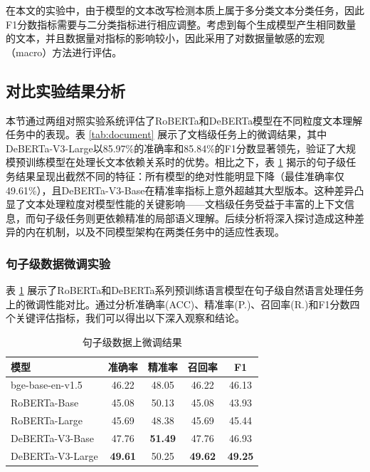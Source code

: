 在本文的实验中，由于模型的文本改写检测本质上属于多分类文本分类任务，因此F1分数指标需要与二分类指标进行相应调整。考虑到每个生成模型产生相同数量的文本，并且数据量对指标的影响较小，因此采用了对数据量敏感的宏观（macro）方法进行评估。

\subsection{对比实验结果分析}
\label{sec:method-experiment-main}

本节通过两组对照实验系统评估了RoBERTa和DeBERTa模型在不同粒度文本理解任务中的表现。表 \ref{tab:document} 展示了文档级任务上的微调结果，其中DeBERTa-V3-Large以85.97\%的准确率和85.84\%的F1分数显著领先，验证了大规模预训练模型在处理长文本依赖关系时的优势。相比之下，表 \ref{tab:sentence} 揭示的句子级任务结果呈现出截然不同的特征：所有模型的绝对性能明显下降（最佳准确率仅49.61\%），且DeBERTa-V3-Base在精准率指标上意外超越其大型版本。这种差异凸显了文本处理粒度对模型性能的关键影响——文档级任务受益于丰富的上下文信息，而句子级任务则更依赖精准的局部语义理解。后续分析将深入探讨造成这种差异的内在机制，以及不同模型架构在两类任务中的适应性表现。

\subsubsection{句子级数据微调实验}

表 \ref{tab:sentence} 展示了RoBERTa和DeBERTa系列预训练语言模型在句子级自然语言处理任务上的微调性能对比。通过分析准确率(ACC)、精准率(P.)、召回率(R.)和F1分数四个关键评估指标，我们可以得出以下深入观察和结论。

\begin{table}[htbp]
\caption{句子级数据上微调结果}
\centering
\begin{tabular}{l|cccc}
\toprule
\textbf{模型}& \textbf{准确率}   & \textbf{精准率}    & \textbf{召回率}    & \textbf{F1}   \\ \midrule
bge-base-en-v1.5  \cite{bge_embedding}   & 46.22          & 48.05          & 46.22          & 46.13          \\
RoBERTa-Base \cite{liu_roberta_2019}     & 45.08          & 50.13          & 45.08          & 43.93          \\
RoBERTa-Large \cite{liu_roberta_2019}    & 45.69          & 48.38          & 45.69          & 45.44          \\
DeBERTa-V3-Base \cite{he2023debertav3improvingdebertausing} & 47.76          & \textbf{51.49} & 47.76          & 46.93          \\
DeBERTa-V3-Large \cite{he2023debertav3improvingdebertausing} & \textbf{49.61} & 50.25          & \textbf{49.62} & \textbf{49.25} \\ \bottomrule
\end{tabular}
\label{tab:sentence}
\end{table}

